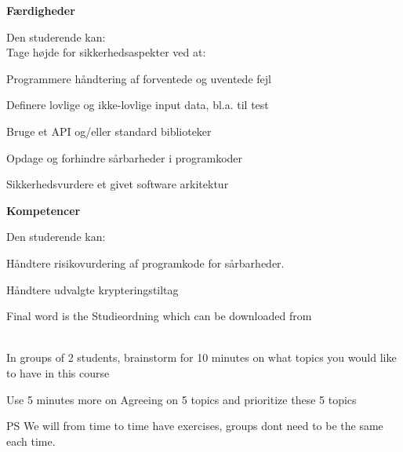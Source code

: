 \documentclass[Screen16to9,17pt]{foils}
\begin{document}

{\bf Færdigheder}

Den studerende kan:\\
Tage højde for sikkerhedsaspekter ved at:
\begin{list2}
\item Programmere håndtering af forventede og uventede fejl
\item Definere lovlige og ikke-lovlige input data, bl.a. til test
\item Bruge et API og/eller standard biblioteker
\item Opdage og forhindre sårbarheder i programkoder
\item Sikkerhedsvurdere et givet software arkitektur
\end{list2}


{\bf Kompetencer}

Den studerende kan:
\begin{list2}
\item Håndtere risikovurdering af programkode for sårbarheder.
\item Håndtere udvalgte krypteringstiltag
\end{list2}

Final word is the Studieordning which can be downloaded from\\
{\footnotesize {}\\
}




In groups of 2 students, brainstorm for 10 minutes on what topics you would like to have in this course

Use 5 minutes more on Agreeing on 5 topics and prioritize these 5 topics

\vskip 1cm
PS We will from time to time have exercises, groups dont need to be the same each time.


\end{document}

